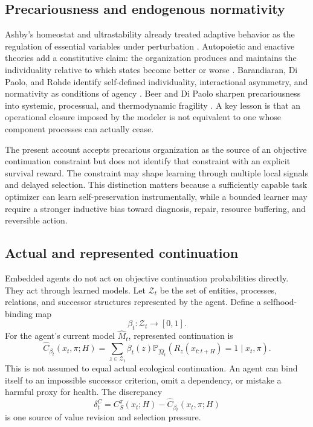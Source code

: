 \documentclass[11pt]{article}
\newcommand{\Pp}{\mathbb{P}}
\begin{document}
\subsection{Precariousness and endogenous normativity}

Ashby's homeostat and ultrastability already treated adaptive behavior as the regulation of essential variables under perturbation \citep{ashby1952,ashby1956}. Autopoietic and enactive theories add a constitutive claim: the organization produces and maintains the individuality relative to which states become better or worse \citep{varela1974,dipaolo2005}. Barandiaran, Di Paolo, and Rohde identify self-defined individuality, interactional asymmetry, and normativity as conditions of agency \citep{barandiaran2009}. Beer and Di Paolo sharpen precariousness into systemic, processual, and thermodynamic fragility \citep{beer2023}. A key lesson is that an operational closure imposed by the modeler is not equivalent to one whose component processes can actually cease.

The present account accepts precarious organization as the source of an objective continuation constraint but does not identify that constraint with an explicit survival reward. The constraint may shape learning through multiple local signals and delayed selection. This distinction matters because a sufficiently capable task optimizer can learn self-preservation instrumentally, while a bounded learner may require a stronger inductive bias toward diagnosis, repair, resource buffering, and reversible action.

\subsection{Actual and represented continuation}

Embedded agents do not act on objective continuation probabilities directly. They act through learned models. Let $\mathcal Z_t$ be the set of entities, processes, relations, and successor structures represented by the agent. Define a selfhood-binding map
\begin{equation}
\beta_t:\mathcal Z_t\rightarrow[0,1].
\label{eq:selfhood-map}
\end{equation}
For the agent's current model $\widehat M_t$, represented continuation is
\begin{equation}
\widehat C_{\beta_t}(x_t,\pi;H)
=
\sum_{z\in\mathcal Z_t}
\beta_t(z)
\Pp_{\widehat M_t}\!\left(R_z(x_{t:t+H})=1\mid x_t,\pi\right).
\label{eq:represented-continuation}
\end{equation}
This is not assumed to equal actual ecological continuation. An agent can bind itself to an impossible successor criterion, omit a dependency, or mistake a harmful proxy for health. The discrepancy
\begin{equation}
\delta^C_t
=
C_S^{\pi}(x_t;H)-\widehat C_{\beta_t}(x_t,\pi;H)
\end{equation}
is one source of value revision and selection pressure.
\end{document}
